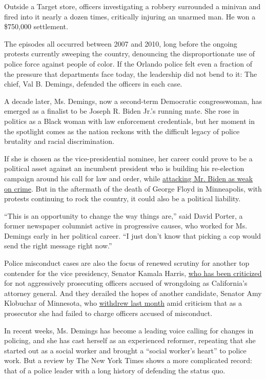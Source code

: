 Outside a Target store, officers investigating a robbery surrounded a
minivan and fired into it nearly a dozen times, critically injuring an
unarmed man. He won a \$750,000 settlement.

The episodes all occurred between 2007 and 2010, long before the ongoing
protests currently sweeping the country, denouncing the disproportionate
use of police force against people of color. If the Orlando police felt
even a fraction of the pressure that departments face today, the
leadership did not bend to it: The chief, Val B. Demings, defended the
officers in each case.

A decade later, Ms. Demings, now a second-term Democratic congresswoman,
has emerged as a finalist to be Joseph R. Biden Jr.'s running mate. She
rose in politics as a Black woman with law enforcement credentials, but
her moment in the spotlight comes as the nation reckons with the
difficult legacy of police brutality and racial discrimination.

If she is chosen as the vice-presidential nominee, her career could
prove to be a political asset against an incumbent president who is
building his re-election campaign around his call for law and order,
while
\href{https://www.nytimes3xbfgragh.onion/2020/07/13/us/politics/trump-police-reform.html}{attacking
Mr. Biden as weak on crime}. But in the aftermath of the death of George
Floyd in Minneapolis, with protests continuing to rock the country, it
could also be a political liability.

``This is an opportunity to change the way things are,'' said David
Porter, a former newspaper columnist active in progressive causes, who
worked for Ms. Demings early in her political career. ``I just don't
know that picking a cop would send the right message right now.''

Police misconduct cases are also the focus of renewed scrutiny for
another top contender for the vice presidency, Senator Kamala Harris,
\href{https://www.nytimes3xbfgragh.onion/2019/06/09/us/politics/kamala-harris-2020-prosecutor-.html}{who
has been criticized} for not aggressively prosecuting officers accused
of wrongdoing as California's attorney general. And they derailed the
hopes of another candidate, Senator Amy Klobuchar of Minnesota, who
\href{https://www.nytimes3xbfgragh.onion/2020/06/18/us/politics/amy-klobuchar-biden-vice-president.html}{withdrew
last month} amid criticism that as a prosecutor she had failed to charge
officers accused of misconduct.

In recent weeks, Ms. Demings has become a leading voice calling for
changes in policing, and she has cast herself as an experienced
reformer, repeating that she started out as a social worker and brought
a ``social worker's heart'' to police work. But a review by The New York
Times shows a more complicated record: that of a police leader with a
long history of defending the status quo.

